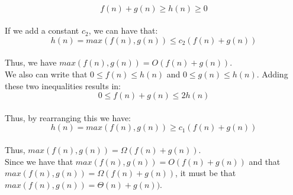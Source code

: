 \documentclass{article}
\begin{document}
\begin{enumerate}
	\\ $$f(n)+g(n)\geq h(n) \geq 0$$
	\\ If we add a constant $c_2$, we can have that:
	\\ $$h(n)=max(f(n),g(n))\leq c_2(f(n)+g(n))$$ 
	\\ Thus, we have $max(f(n),g(n))= O(f(n)+g(n))$.
	\\ We also can write that $0 \leq f(n) \leq h(n)$ and $0 \leq g(n) \leq h(n)$. Adding these two inequalities results in:
	\\ $$0\leq f(n)+g(n)\leq 2h(n)$$
	\\ Thus, by rearranging this we have:
	\\ $$h(n)=max(f(n),g(n))\geq c_1(f(n)+g(n))$$
	\\ Thus, $max(f(n),g(n))= \Omega(f(n)+g(n))$.
	\\ Since we have that $max(f(n),g(n))= O(f(n)+g(n))$ and that $max(f(n),g(n))= \Omega(f(n)+g(n))$, it must be that $max(f(n),g(n))= \Theta(n)+g(n))$.
\end{enumerate}
\end{document}
